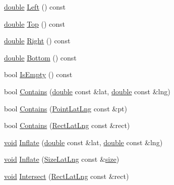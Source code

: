 \begin{DoxyCompactItemize}
\item 
\hyperlink{_super_l_u_support_8h_a8956b2b9f49bf918deed98379d159ca7}{double} \hyperlink{group___o_p_map_widget_gaad643d7228be938282ad2c56a98cbc71}{Left} () const 
\item 
\hyperlink{_super_l_u_support_8h_a8956b2b9f49bf918deed98379d159ca7}{double} \hyperlink{group___o_p_map_widget_ga1c2062c6fe46c3769c4e9a0d5eef59b8}{Top} () const 
\item 
\hyperlink{_super_l_u_support_8h_a8956b2b9f49bf918deed98379d159ca7}{double} \hyperlink{group___o_p_map_widget_ga1a6604525748f3a62fb2e026bd5a4e9d}{Right} () const 
\item 
\hyperlink{_super_l_u_support_8h_a8956b2b9f49bf918deed98379d159ca7}{double} \hyperlink{group___o_p_map_widget_ga56065ec26f127c4763bcb6002a1f4e23}{Bottom} () const 
\item 
bool \hyperlink{group___o_p_map_widget_ga4b7818f2eee94eb3c8ecb308da6a4c1b}{Is\-Empty} () const 
\item 
bool \hyperlink{group___o_p_map_widget_ga08c25e5064c11d63c96a89619f027b89}{Contains} (\hyperlink{_super_l_u_support_8h_a8956b2b9f49bf918deed98379d159ca7}{double} const \&lat, \hyperlink{_super_l_u_support_8h_a8956b2b9f49bf918deed98379d159ca7}{double} const \&lng)
\item 
bool \hyperlink{group___o_p_map_widget_ga15911b1ea5d85590ac05427410787b40}{Contains} (\hyperlink{structinternals_1_1_point_lat_lng}{Point\-Lat\-Lng} const \&pt)
\item 
bool \hyperlink{group___o_p_map_widget_gafd896574ac80e5ee28f536db3a8391a2}{Contains} (\hyperlink{structinternals_1_1_rect_lat_lng}{Rect\-Lat\-Lng} const \&rect)
\item 
\hyperlink{group___u_a_v_objects_plugin_ga444cf2ff3f0ecbe028adce838d373f5c}{void} \hyperlink{group___o_p_map_widget_gaff9d1cc5fb1f00965fad7de448ee3aa3}{Inflate} (\hyperlink{_super_l_u_support_8h_a8956b2b9f49bf918deed98379d159ca7}{double} const \&lat, \hyperlink{_super_l_u_support_8h_a8956b2b9f49bf918deed98379d159ca7}{double} const \&lng)
\item 
\hyperlink{group___u_a_v_objects_plugin_ga444cf2ff3f0ecbe028adce838d373f5c}{void} \hyperlink{group___o_p_map_widget_gab43105de3a7b0711e47f7e02e0359f2c}{Inflate} (\hyperlink{structinternals_1_1_size_lat_lng}{Size\-Lat\-Lng} const \&\hyperlink{glext_8h_a014d89bd76f74ef3a29c8f04b473eb76}{size})
\item 
\hyperlink{group___u_a_v_objects_plugin_ga444cf2ff3f0ecbe028adce838d373f5c}{void} \hyperlink{group___o_p_map_widget_ga829f6c41bb7332b5c596f417157972a7}{Intersect} (\hyperlink{structinternals_1_1_rect_lat_lng}{Rect\-Lat\-Lng} const \&rect)

\end{DoxyCompactItemize}

